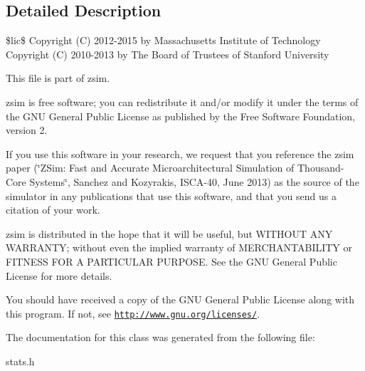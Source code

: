 \subsection{Detailed Description}
\$lic\$ Copyright (C) 2012-\/2015 by Massachusetts Institute of Technology Copyright (C) 2010-\/2013 by The Board of Trustees of Stanford University

This file is part of zsim.

zsim is free software; you can redistribute it and/or modify it under the terms of the G\-N\-U General Public License as published by the Free Software Foundation, version 2.

If you use this software in your research, we request that you reference the zsim paper (\char`\"{}\-Z\-Sim\-: Fast and Accurate Microarchitectural Simulation of
\-Thousand-\/\-Core Systems\char`\"{}, Sanchez and Kozyrakis, I\-S\-C\-A-\/40, June 2013) as the source of the simulator in any publications that use this software, and that you send us a citation of your work.

zsim is distributed in the hope that it will be useful, but W\-I\-T\-H\-O\-U\-T A\-N\-Y W\-A\-R\-R\-A\-N\-T\-Y; without even the implied warranty of M\-E\-R\-C\-H\-A\-N\-T\-A\-B\-I\-L\-I\-T\-Y or F\-I\-T\-N\-E\-S\-S F\-O\-R A P\-A\-R\-T\-I\-C\-U\-L\-A\-R P\-U\-R\-P\-O\-S\-E. See the G\-N\-U General Public License for more details.

You should have received a copy of the G\-N\-U General Public License along with this program. If not, see \href{http://www.gnu.org/licenses/}{\tt http\-://www.\-gnu.\-org/licenses/}. 

The documentation for this class was generated from the following file\-:\begin{DoxyCompactItemize}
\item 
stats.\-h\end{DoxyCompactItemize}
